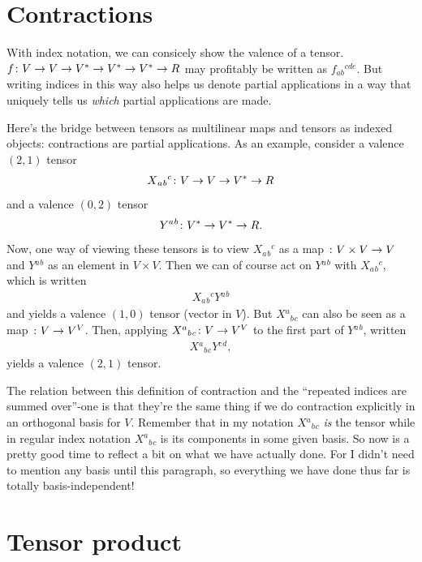 \documentclass[english, 12pt]{article}
\begin{document}
\section{Contractions}%
\label{sec:contractions}

With index notation, we can consicely show the valence of a tensor.
$f \colon V \to V \to {V}^{\ast} \to {V}^{\ast} \to {V}^{\ast} \to R$ may profitably be written as $f{}_{a b}{}^{c d e}$.
But writing indices in this way also helps us denote partial applications in a way that uniquely tells us \emph{which} partial applications are made.

Here's the bridge between tensors as multilinear maps and tensors as indexed objects: contractions are partial applications.
As an example, consider a valence $(2, 1)$ tensor
\begin{align*}
	X{}_a{}_b{}^c \colon V \to V \to {V}^{\ast} \to R
\end{align*}
and a valence $(0, 2)$ tensor
\begin{align*}
	Y{}^a{}^b \colon {V}^{\ast} \to {V}^{\ast} \to R.
\end{align*}
Now, one way of viewing these tensors is to view $X{}_a{}_b{}^c$ as a map $\colon V \times V \to V$ and $Y{}^a{}^b$ as an element in $V \times V$.
Then we can of course act on $Y{}^a{}^b$ with $X{}_a{}_b{}^c$,
which is written
\begin{align*}
	X{}_a{}_b{}^c Y{}^a{}^b
\end{align*}
and yields a valence $(1, 0)$ tensor (vector in $V$).
But $X{}^a{}_b{}_c$ can also be seen as a map $\colon V \to V^V$.
Then, applying $X{}^a{}_b{}_c\colon V \to V^V$ to the first part of $Y{}^a{}^b$, written
\begin{align*}
	X{}^a{}_b{}_c Y{}^c{}^d,
\end{align*}
yields a valence $(2, 1)$ tensor.

The relation between this definition of contraction and the \enquote{repeated indices are summed over}-one is that they're the same thing if we do contraction explicitly in an orthogonal basis for $V$.
Remember that in my notation $X{}^a{}_b{}_c$ \emph{is} the tensor while in regular index notation $X{}^a{}_b{}_c$ is its components in some given basis.
So now is a pretty good time to reflect a bit on what we have actually done.
For I didn't need to mention any basis until this paragraph, so everything we have done thus far is totally basis-independent!

\section{Tensor product}%
\label{sec:tensor_product}
\end{document}

